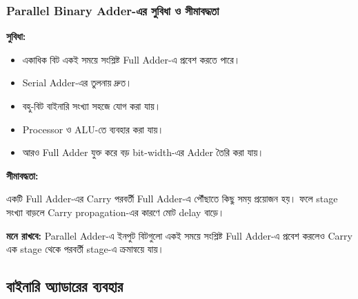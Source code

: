 
\subsubsection*{\textenglish{Parallel Binary Adder}-এর সুবিধা ও সীমাবদ্ধতা}

\textbf{সুবিধা:}

\begin{itemize}[label={{\bulletfont\textbullet}}, leftmargin=*, nosep]

    \item একাধিক বিট একই সময়ে সংশ্লিষ্ট
    \textenglish{Full Adder}-এ প্রবেশ করতে পারে।

    \item \textenglish{Serial Adder}-এর তুলনায় দ্রুত।

    \item বহু-বিট বাইনারি সংখ্যা সহজে যোগ করা যায়।

    \item \textenglish{Processor} ও
    \textenglish{ALU}-তে ব্যবহার করা যায়।

    \item আরও \textenglish{Full Adder} যুক্ত করে বড়
    \textenglish{bit-width}-এর \textenglish{Adder} তৈরি করা যায়।

\end{itemize}

\textbf{সীমাবদ্ধতা:}

একটি \textenglish{Full Adder}-এর \textenglish{Carry}
পরবর্তী \textenglish{Full Adder}-এ পৌঁছাতে কিছু সময় প্রয়োজন হয়।
ফলে \textenglish{stage} সংখ্যা বাড়লে
\textenglish{Carry propagation}-এর কারণে মোট
\textenglish{delay} বাড়ে।

\par\begingroup

\textbf{মনে রাখবে:}
\textenglish{Parallel Adder}-এ ইনপুট বিটগুলো একই সময়ে সংশ্লিষ্ট
\textenglish{Full Adder}-এ প্রবেশ করলেও
\textenglish{Carry} এক \textenglish{stage} থেকে পরবর্তী
\textenglish{stage}-এ ক্রমান্বয়ে যায়।
\par\endgroup




\subsection{বাইনারি অ্যাডারের ব্যবহার}

